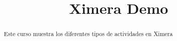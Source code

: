 \documentclass{xourse}
\title{Ximera Demo}
\begin{document}
  
\begin{abstract} %
Este curso muestra los diferentes tipos de actividades en Ximera
\end{abstract}  
\maketitle  
 
 
\end{document}
